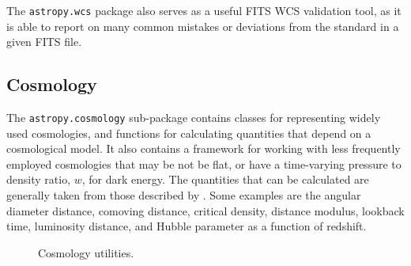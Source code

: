 \documentclass[traditabstract]{aa}
\begin{document}
The \texttt{astropy.wcs} package also serves as a useful FITS WCS validation
tool, as it is able to report on many common mistakes or deviations from the
standard in a given FITS file.

\subsection{Cosmology}

\label{sec:cosmology}


The \texttt{astropy.cosmology} sub-package contains classes for representing
widely used cosmologies, and functions for calculating quantities that depend
on a cosmological model. It also contains a framework for working with less
frequently employed cosmologies that may be not be flat, or have a time-varying
pressure to density ratio, $w$, for dark energy. The quantities that can be
calculated are generally taken from those described by \citet{Hogg99}. Some
examples are the angular diameter distance, comoving distance, critical
density, distance modulus, lookback time, luminosity distance, and Hubble
parameter as a function of redshift.

\begin{figure}
\center
\caption{Cosmology utilities.\label{code:cosmology}}
\vspace{0.1in}
\end{figure}
\end{document}
